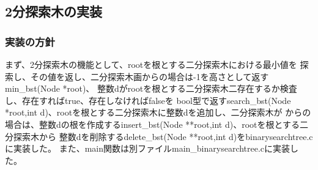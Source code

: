 \documentclass{ltjsarticle}
\begin{document}
\subsection{2分探索木の実装}
\subsubsection{実装の方針}
まず、2分探索木の機能として、rootを根とする二分探索木における最小値を
探索し、その値を返し、二分探索木画からの場合は-1を高さとして返すmin\_bst(Node *root)、
整数dがrootを根とする二分探索木二存在するか検査し、存在すればtrue、存在しなければfalseを
bool型で返すsearch\_bst(Node *root,int d)、rootを根とする二分探索木に整数dを追加し、二分探索木が
からの場合は、整数dの根を作成するinsert\_bst(Node **root,int d)、rootを根とする二分探索木から
整数dを削除するdelete\_bst(Node **root,int d)をbinarysearchtree.cに実装した。
また、main関数は別ファイルmain\_binarysearchtree.cに実装した。
\end{document}
